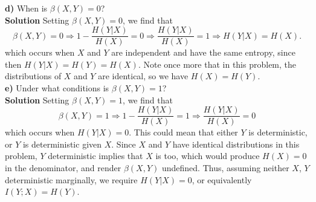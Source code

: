 \documentclass[11pt, letterpaper]{article}
\begin{document}
{\bf d)} When is $\beta(X,Y)=0$?\\[10pt]
{\bf Solution} Setting $\beta(X,Y)=0$, we find that
\[\beta(X,Y)=0\Rightarrow 1-\frac{H(Y|X)}{H(X)}=0\Rightarrow\frac{H(Y|X)}{H(X)}=1\Rightarrow H(Y|X)=H(X).\]
which occurs when $X$ and $Y$ are independent and have the same entropy, since then $H(Y|X)=H(Y)=H(X)$. Note once more that in this problem, the distributions of $X$ and $Y$ are identical, so we have $H(X)=H(Y)$.\\[10pt]
{\bf e)} Under what conditions is $\beta(X,Y)=1$?\\[10pt]
{\bf Solution} Setting $\beta(X,Y)=1$, we find that
\[\beta(X,Y)=1\Rightarrow 1-\frac{H(Y|X)}{H(X)}=1\Rightarrow\frac{H(Y|X)}{H(X)}=0\]
which occurs when $H(Y|X)=0$. This could mean that either $Y$ is deterministic, or $Y$ is deterministic given $X$. Since $X$ and $Y$ have identical distributions in this problem, $Y$ deterministic implies that $X$ is too, which
would produce $H(X)=0$ in the denominator, and render $\beta(X,Y)$ undefined. Thus, assuming neither $X$, $Y$ deterministic marginally, we require $H(Y|X)=0$, or equivalently $I(Y;X)=H(Y)$.
\end{document}
